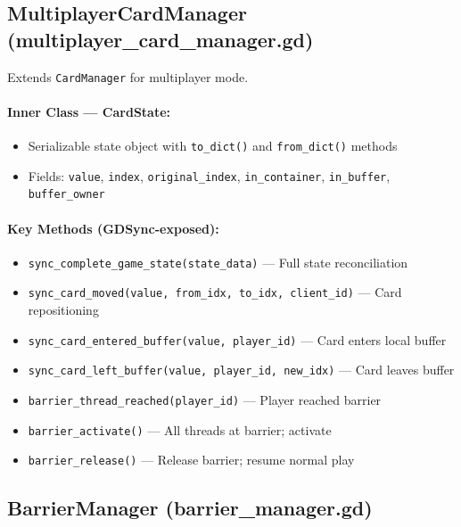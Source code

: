 \subsection{MultiplayerCardManager (multiplayer\_card\_manager.gd)}
\label{app:c:multiplayer-card-manager-class}

Extends \texttt{CardManager} for multiplayer mode.

\paragraph*{Inner Class --- CardState:}
\begin{itemize}
    \item Serializable state object with \texttt{to\_dict()} and \texttt{from\_dict()} methods
    \item Fields: \texttt{value}, \texttt{index}, \texttt{original\_index}, \texttt{in\_container}, \texttt{in\_buffer}, \texttt{buffer\_owner}
\end{itemize}

\paragraph*{Key Methods (GDSync-exposed):}
\begin{itemize}
    \item \texttt{sync\_complete\_game\_state(state\_data)} --- Full state reconciliation
    \item \texttt{sync\_card\_moved(value, from\_idx, to\_idx, client\_id)} --- Card repositioning
    \item \texttt{sync\_card\_entered\_buffer(value, player\_id)} --- Card enters local buffer
    \item \texttt{sync\_card\_left\_buffer(value, player\_id, new\_idx)} --- Card leaves buffer
    \item \texttt{barrier\_thread\_reached(player\_id)} --- Player reached barrier
    \item \texttt{barrier\_activate()} --- All threads at barrier; activate
    \item \texttt{barrier\_release()} --- Release barrier; resume normal play
\end{itemize}

\subsection{BarrierManager (barrier\_manager.gd)}
\label{app:c:barrier-manager-class}

